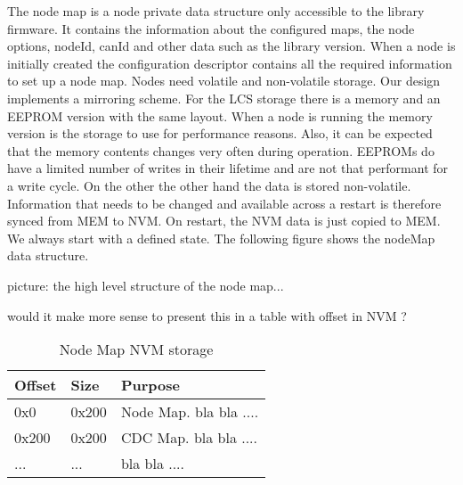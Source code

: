 The node map is a node private data structure only accessible to the library firmware. It contains the information about the configured maps, the node options, nodeId, canId and other data such as the library version. When a node is initially created the configuration descriptor contains all the required information to set up a node map. Nodes need volatile and non-volatile storage. Our design implements a mirroring scheme. For the LCS storage there is a memory and an EEPROM version with the same layout. When a node is running the memory version is the storage to use for performance reasons. Also, it can be expected that the memory contents changes very often during operation. EEPROMs do have a limited number of writes in their lifetime and are not that performant for a write cycle. On the other the other hand the data is stored non-volatile. Information that needs to be changed and available across a restart is therefore synced from MEM to NVM. On restart, the NVM data is just copied to MEM. We always start with a defined state. The following figure shows the nodeMap data structure.


picture: the high level structure of the node map...

would it make more sense to present this in a table with offset in NVM ?

\begin{table}[!ht]
    \begin{center}
        \caption{Node Map NVM storage}
        \begin{tabular}{|l|l|p{}|}
            \toprule
            \textbf{Offset} & \textbf{Size} & \textbf{Purpose} \\
            \midrule
            0x0 & 0x200 & Node Map. bla bla .... \\
            \midrule
            0x200 & 0x200 & CDC Map. bla bla .... \\
            \midrule
            ... & ... & bla bla ....\\
            \bottomrule
        \end{tabular}
    \end{center}
\end{table}

\begin{figure}[!ht]
    \centering
\end{figure}

